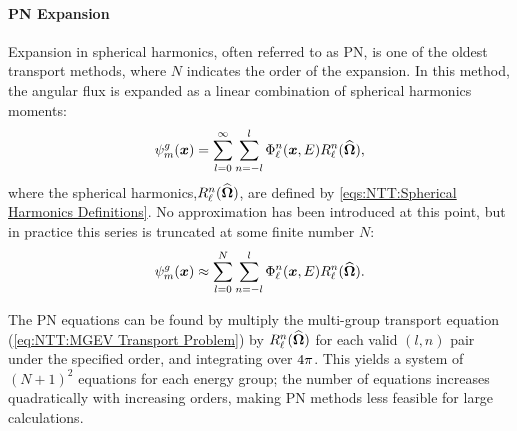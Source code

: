 {{{{                \paragraph{\acf{PN} Expansion} {
                  Expansion in spherical harmonics, often referred to as \acs{PN}, is one of the oldest transport methods, where $N$ indicates the order of the expansion.
                  In this method, the angular flux is expanded as a linear combination of spherical harmonics moments:
                  \begin{equation}\label{eq:PN:PN Infinite Expansion}
                    \aflux = \suml[l=0][\infty]\suml[n=-l][l]\afluxmom\SH,
                  \end{equation}
                  where the spherical harmonics,$\SH$, are defined by \cref{eqs:NTT:Spherical Harmonics Definitions}.
                  No approximation has been introduced at this point, but in practice this series is truncated at some finite number $N$:
                  \begin{equation}\label{eq:PN:PN Expansion}
                    \aflux \approx \suml[l=0][N]\suml[n=-l][l]\afluxmom\SH.
                  \end{equation}

                  The \ac{PN} equations can be found by multiply the multi-group transport equation (\cref{eq:NTT:MGEV Transport Problem}) by $\SH$ for each valid $(l,n)$ pair under the specified order, and integrating over $4\pi$.
                  This yields a system of $(N+1)^2$ equations for each energy group; the number of equations increases quadratically with increasing orders, making \ac{PN} methods less feasible for large calculations.
                }

}}}}
